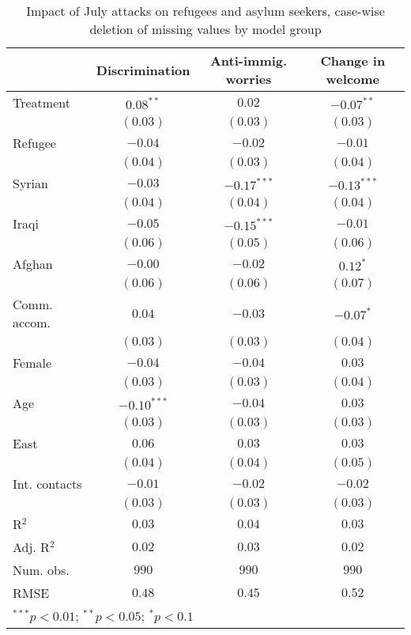 
\begin{table}
\caption{Impact of July attacks on refugees and asylum seekers, case-wise deletion of missing values by model group}
\begin{center}
\begin{tabular}{l c c c}
\toprule
 & Discrimination & Anti-immig. worries & Change in welcome \\
\midrule
Treatment     & $0.08^{**}$   & $0.02$        & $-0.07^{**}$  \\
              & $(0.03)$      & $(0.03)$      & $(0.03)$      \\
Refugee       & $-0.04$       & $-0.02$       & $-0.01$       \\
              & $(0.04)$      & $(0.03)$      & $(0.04)$      \\
Syrian        & $-0.03$       & $-0.17^{***}$ & $-0.13^{***}$ \\
              & $(0.04)$      & $(0.04)$      & $(0.04)$      \\
Iraqi         & $-0.05$       & $-0.15^{***}$ & $-0.01$       \\
              & $(0.06)$      & $(0.05)$      & $(0.06)$      \\
Afghan        & $-0.00$       & $-0.02$       & $0.12^{*}$    \\
              & $(0.06)$      & $(0.06)$      & $(0.07)$      \\
Comm. accom.  & $0.04$        & $-0.03$       & $-0.07^{*}$   \\
              & $(0.03)$      & $(0.03)$      & $(0.04)$      \\
Female        & $-0.04$       & $-0.04$       & $0.03$        \\
              & $(0.03)$      & $(0.03)$      & $(0.04)$      \\
Age           & $-0.10^{***}$ & $-0.04$       & $0.03$        \\
              & $(0.03)$      & $(0.03)$      & $(0.03)$      \\
East          & $0.06$        & $0.03$        & $0.03$        \\
              & $(0.04)$      & $(0.04)$      & $(0.05)$      \\
Int. contacts & $-0.01$       & $-0.02$       & $-0.02$       \\
              & $(0.03)$      & $(0.03)$      & $(0.03)$      \\
\midrule
R$^2$         & $0.03$        & $0.04$        & $0.03$        \\
Adj. R$^2$    & $0.02$        & $0.03$        & $0.02$        \\
Num. obs.     & $990$         & $990$         & $990$         \\
RMSE          & $0.48$        & $0.45$        & $0.52$        \\
\bottomrule
\multicolumn{4}{l}{\scriptsize{$^{***}p<0.01$; $^{**}p<0.05$; $^{*}p<0.1$}}
\end{tabular}
\label{tab_host_na_group}
\end{center}
\end{table}
